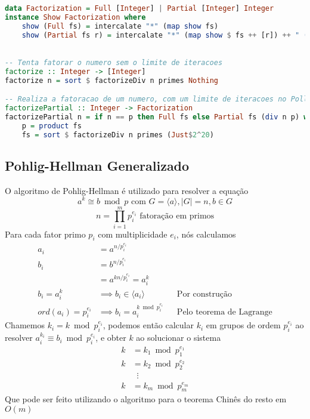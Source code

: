 \documentclass{article}
\begin{document}
\noindent\hspace{0.03\linewidth}
\begin{minipage}{0.9\linewidth}
\begin{lstlisting}[language=haskell,caption=Fatoração]
data Factorization = Full [Integer] | Partial [Integer] Integer
instance Show Factorization where
    show (Full fs) = intercalate "*" (map show fs)
    show (Partial fs r) = intercalate "*" (map show $ fs ++ [r]) ++ " (fatoracao parcial)"
    

-- Tenta fatorar o numero sem o limite de iteracoes
factorize :: Integer -> [Integer]
factorize n = sort $ factorizeDiv n primes Nothing

-- Realiza a fatoracao de um numero, com um limite de iteracoes no Pollard Rho
factorizePartial :: Integer -> Factorization
factorizePartial n = if n == p then Full fs else Partial fs (div n p) where
    p = product fs
    fs = sort $ factorizeDiv n primes (Just$2^20)
\end{lstlisting}        
\end{minipage}

\subsection{Pohlig-Hellman Generalizado}
O algoritmo de Pohlig-Hellman é utilizado para resolver a equação
$$ a^k \cong b \bmod p \text{ com } G = \langle a \rangle, |G| = n, b \in G$$
$$ n = \prod_{i=1}^{m}p_i^{e_i} \text{ fatoração em primos} $$
Para cada fator primo $p_i$ com multiplicidade $e_i$, nós calculamos
\begin{align*}
    a_i &= a^{n/p_i^{e_i}}\\
    b_i &= b^{n/p_i^{e_i}}\\
        &= a^{k n/p_i^{e_i}} = a_i^k\\
    b_i = a_i^k &\implies b_i \in \langle a_i \rangle            &&\text{Por construção}\\
    ord(a_i) = p_i^{e_i} &\implies b_i = a_i^{k \bmod p_i^{e_i}} &&\text{Pelo teorema de Lagrange}
\end{align*}
Chamemos $ k_i = k \bmod p_i^{e_i} $, podemos então calcular $k_i$ em grupos de ordem $p_i^{e_i}$ ao resolver $a_i^{k_i} \equiv b_i \bmod p_i^{e_i}$, e obter $k$ ao solucionar o sistema
\begin{align*}
    k &= k_1 \bmod p_1^{e_1} \\
    k &= k_2 \bmod p_2^{e_2} \\
    &\;\;\vdots \\
    k &= k_m \bmod p_m^{e_m}
\end{align*}
Que pode ser feito utilizando o algoritmo para o teorema Chinês do resto em $O(m)$
\end{document}
